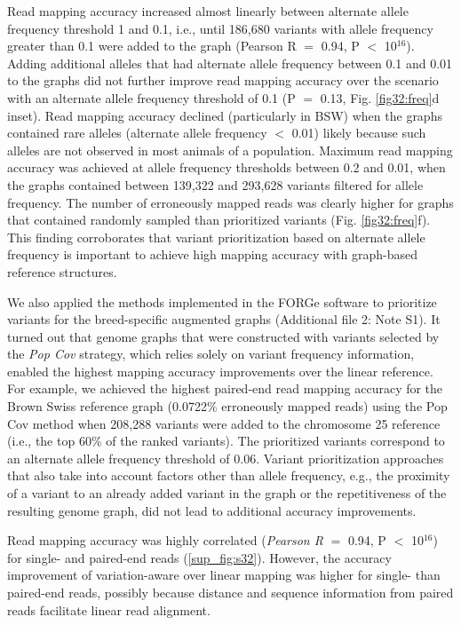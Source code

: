 \documentclass[../main.tex]{subfiles}
\begin{document}
Read mapping accuracy increased almost linearly between alternate allele frequency threshold 1 and 0.1, i.e., until 186,680 variants with allele frequency greater than 0.1 were added to the graph (Pearson R $=$ 0.94, P $<$ 10$^{16}$). Adding additional alleles that had alternate allele frequency between 0.1 and 0.01 to the graphs did not further improve read mapping accuracy over the scenario with an alternate allele frequency threshold of 0.1 (P $=$ 0.13, Fig. \ref{fig32:freq}d inset). Read mapping accuracy declined (particularly in BSW) when the graphs contained rare alleles (alternate allele frequency $<$ 0.01) likely because such alleles are not observed in most animals of a population. Maximum read mapping accuracy was achieved at allele frequency thresholds between 0.2 and 0.01, when the graphs contained between 139,322 and 293,628 variants filtered for allele frequency. The number of erroneously mapped reads was clearly higher for graphs that contained randomly sampled than prioritized variants (Fig. \ref{fig32:freq}f). This finding corroborates that variant prioritization based on alternate allele frequency is important to achieve high mapping accuracy with graph-based reference structures.

We also applied the methods implemented in the FORGe software \citep{pritt2018forge} to prioritize variants for the breed-specific augmented graphs (Additional file 2: Note S1). It turned out that genome graphs that were constructed with variants selected by the \emph{Pop Cov} strategy, which relies solely on variant frequency information, enabled the highest mapping accuracy improvements over the linear reference. For example, we achieved the highest paired-end read mapping accuracy for the Brown Swiss reference graph (0.0722\% erroneously mapped reads) using the Pop Cov method when 208,288 variants were added to the chromosome 25 reference (i.e., the top 60\% of the ranked variants). The prioritized variants correspond to an alternate allele frequency threshold of 0.06. Variant prioritization approaches that also take into account factors other than allele frequency, e.g., the proximity of a variant to an already added variant in the graph or the repetitiveness of the resulting genome graph, did not lead to additional accuracy improvements.

Read mapping accuracy was highly correlated (\emph{Pearson R} $=$ 0.94, P $<$ 10$^{16}$) for single- and paired-end reads (\ref{sup_fig:s32}). However, the accuracy improvement of variation-aware over linear mapping was higher for single- than paired-end reads, possibly because distance and sequence information from paired reads facilitate linear read alignment.
\end{document}
